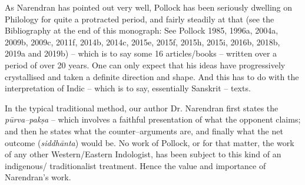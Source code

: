 As Narendran has pointed out very well, Pollock has been seriously dwelling on Philology for quite a protracted period, and fairly steadily at that (see the Bibliography at the end of this monograph: See Pollock 1985, 1996a, 2004a, 2009b, 2009c, 2011f, 2014b, 2014c, 2015e, 2015f, 2015h, 2015i, 2016b, 2018b, 2019a and 2019b) – which is to say some 16 articles/books – written over a period of over 20 years. One can only expect that his ideas have progressively crystallised and taken a definite direction and shape. And this has to do with the interpretation of Indic – which is to say, essentially Sanskrit – texts.

In the typical traditional method, our author Dr. Narendran first states the \textit{pūrva–pakṣa} – which involves a faithful presentation of what the opponent claims; and then he states what the counter–arguments are, and finally what the net outcome (\textit{siddhānta}) would be. No work of Pollock, or for that matter, the work of any other Western/Eastern Indologist, has been subject to this kind of an indigenous/ traditionalist treatment. Hence the value and importance of Narendran’s work.

